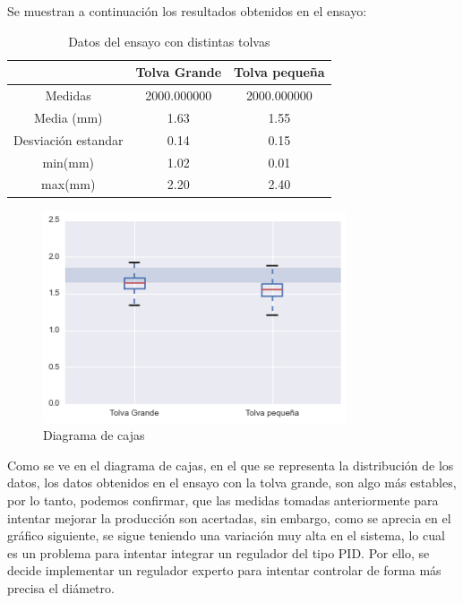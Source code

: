 Se muestran a continuación los resultados obtenidos en el ensayo:

\begin{table}[H]
    \centering
    \begin{tabular}{ccc}
                            & Tolva Grande & Tolva pequeña \\ \hline
        Medidas               & 2000.000000  & 2000.000000   \\
        Media (mm)          & 1.63     & 1.55      \\
        Desviación estandar & 0.14     & 0.15      \\
        min(mm)             & 1.02     & 0.01      \\
        max(mm)             & 2.20     & 2.40     
    \end{tabular}
    \caption{Datos del ensayo con distintas tolvas}
    \label{tab:ensa_tolvas}
\end{table}

\begin{figure}[H]
    \centering
    \includegraphics[width=0.8\textwidth]{images/producciones/22072015/output_6_1.png}
    \caption{Diagrama de cajas }
    \label{fig:22072015-boxplot}
\end{figure}

Como se ve en el diagrama de cajas, en el que se representa la distribución de los datos, los datos obtenidos en el ensayo con la tolva grande, son algo más estables, por lo tanto, podemos confirmar, que las medidas tomadas anteriormente para intentar mejorar la producción son acertadas, sin embargo, como se aprecia en el gráfico siguiente, se sigue teniendo una variación muy alta en el sistema, lo cual es un problema para intentar integrar un regulador del tipo PID. Por ello, se decide implementar un regulador experto para intentar controlar de forma más precisa el diámetro.

